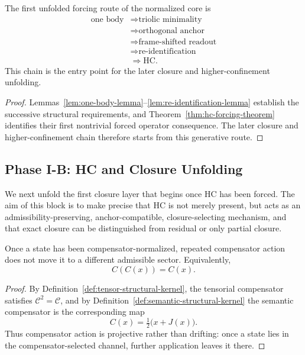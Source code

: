 \begin{corollary}
\label{cor:first-generative-forcing-chain}
The first unfolded forcing route of the normalized core is
\[
\begin{aligned}
\text{one body}
&\Longrightarrow \text{triolic minimality}\\
&\Longrightarrow \text{orthogonal anchor}\\
&\Longrightarrow \text{frame-shifted readout}\\
&\Longrightarrow \text{re-identification}\\
&\Longrightarrow \mathrm{HC}.
\end{aligned}
\]
This chain is the entry point for the later closure and higher-confinement
unfolding.
\end{corollary}

\begin{proof}
Lemmas~\ref{lem:one-body-lemma}--\ref{lem:re-identification-lemma} establish the
successive structural requirements, and
Theorem~\ref{thm:hc-forcing-theorem} identifies their first nontrivial forced
operator consequence. The later closure and higher-confinement chain therefore
starts from this generative route.
\end{proof}


\subsection*{Phase I-B: HC and Closure Unfolding}

We next unfold the first closure layer that begins once HC has been forced.
The aim of this block is to make precise that HC is not merely present, but
acts as an admissibility-preserving, anchor-compatible, closure-selecting
mechanism, and that exact closure can be distinguished from residual or only
partial closure.

\begin{lemma}
\label{lem:hc-idempotence-lemma}
Once a state has been compensator-normalized, repeated compensator action does
not move it to a different admissible sector. Equivalently,
\[
C(C(x)) = C(x).
\]
\end{lemma}

\begin{proof}
By Definition~\ref{def:tensor-structural-kernel}, the tensorial compensator
satisfies $\mathcal C^2=\mathcal C$, and by
Definition~\ref{def:semantic-structural-kernel} the semantic compensator is the
corresponding map
\[
C(x)=\tfrac12\bigl(x+J(x)\bigr).
\]
Thus compensator action is projective rather than drifting: once a state lies
in the compensator-selected channel, further application leaves it there.
\end{proof}

